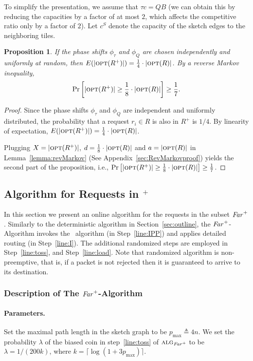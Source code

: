 \documentclass[11pt]{article}
\newtheorem{proposition}[theorem]{Proposition}
\newcommand{\route}{\text{\sc{ipp}}}
\newcommand{\opt}{\text{\textsc{opt}}}
\newcommand{\pmax}{p_{\max}}
\newcommand{\eqdf}{\triangleq}
\newcommand{\alg}{\text{\sc{alg}}}
\newenvironment{proof sketch}[1]{\noindent {\emph{Proof sketch of #1:}}}{\hfill \qed}
\newcommand{\far}{\text{\emph{Far}}}
\newcommand{\algf}{\alg_{\far^+}}
\newcommand{\hl}{\tau}
\newcommand{\vl}{Q}
\begin{document}
To simplify the presentation, we assume that $\hl c=\vl B$
(we can obtain this by reducing the capacities by a factor
of at most $2$, which affects the competitive ratio only by
a factor of $2$). Let $c^S$ denote the capacity of the
sketch edges to the neighboring tiles.



\begin{proposition} \label{prop:class}
  If the phase shifts $\phi_{\hl}$ and $\phi_{\vl}$ are
  chosen independently and uniformly at random, then $E(|\opt (R^+)|)
  = \frac 14 \cdot |\opt(R)|$.  By a reverse Markov inequality, $$\Pr \left[|\opt
  (R^+)| \geq \frac 18 \cdot |\opt(R)|\right] \geq \frac 17.$$
\end{proposition}


\begin{proof}
  Since the phase shifts $\phi_{\hl}$ and $\phi_{\vl}$ are independent
  and uniformly distributed, the probability that a request $r_i\in R$
  is also in $R^+$ is $1/4$.  By linearity of expectation, $E(|\opt
  (R^+)|)= \frac 14 \cdot |\opt(R)|$.

  Plugging $X=|\opt (R^+)|$, $d=\frac 18 \cdot |\opt(R)|$ and
  $a=|\opt(R)|$ in Lemma~\ref{lemma:revMarkov} (See
  Appendix~\ref{sec:RevMarkovproof}) yields the second part of the
  proposition, i.e., $\Pr \left[|\opt(R^+)| \geq \frac 18 \cdot
    |\opt(R)|\right] \geq \frac 17$.
\end{proof}


\subsection{Algorithm for Requests in \far$^+$}\label{sec:far}
In this section we present an online algorithm for the
requests in the subset $\far^+$. Similarly to the
deterministic algorithm in Section~\ref{sec:outline}, the
$\far^+$-Algorithm invokes the \route\ algorithm (in
Step~\ref{line:IPP}) and applies detailed routing (in
Step~\ref{line:I}). The additional randomized steps are
employed in Step~\ref{line:toss}, and Step~\ref{line:load}.
Note that randomized algorithm is non-preemptive, that is,
if a packet is not rejected then it is guaranteed to arrive
to its destination.

\subsubsection{Description of The $\far^+$-Algorithm}
\paragraph{Parameters.}
Set the maximal path length in the sketch graph to be $\pmax\eqdf 4n$. We set
the probability $\lambda$ of the biased coin in step~\ref{line:toss} of
$\algf$ to be $\lambda=1/(200k)$, where $k=\lceil \log (1+3\pmax) \rceil$.
\end{document}
